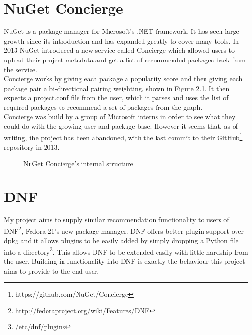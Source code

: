 \documentclass{l4proj}
\begin{document}
\section{NuGet Concierge}
NuGet\cite{nuget} is a package manager for Microsoft's .NET framework. It has seen large growth since its introduction and has expanded greatly to cover many tools. In 2013 NuGet introduced a new service called Concierge\cite{concierge} which allowed users to upload their project metadata and get a list of recommended packages back from the service.\\
Concierge works by giving each package a popularity score and then giving each package pair a bi-directional pairing weighting, shown in Figure 2.1. It then expects a project.conf file from the user, which it parses and uses the list of required packages to recommend a set of packages from the graph.\\
Concierge was build by a group of Microsoft interns in order to see what they could do with the growing user and package base. However it seems that, as of writing, the project has been abandoned, with the last commit to their GitHub\footnote{https://github.com/NuGet/Concierge} repository in 2013.
\begin{figure}
\centerline{}
\caption{NuGet Concierge's internal structure}
\end{figure}

\section{DNF}
My project aims to supply similar recommendation functionality to users of DNF\footnote{http://fedoraproject.org/wiki/Features/DNF}, Fedora 21's new package manager. DNF offers better plugin support over dpkg and it allows plugins to be easily added by simply dropping a Python file into a directory\footnote{/etc/dnf/plugins}. This allows DNF to be extended easily with little hardship from the user. Building in functionality into DNF is exactly the behaviour this project aims to provide to the end user.\\ 
\end{document}
